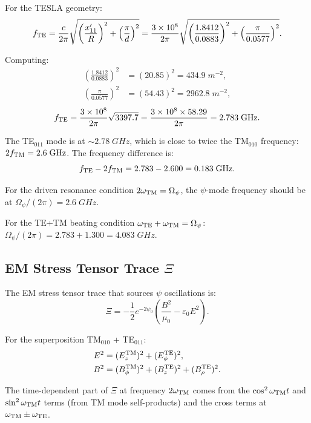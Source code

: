 \documentclass[aps,prd,twocolumn,superscriptaddress,nofootinbib]{revtex4-2}
\newcommand{\ee}[1]{\times 10^{#1}}
\begin{document}
For the TESLA geometry:
\begin{equation}
f_{\rm TE} = \frac{c}{2\pi}\sqrt{\left(\frac{x_{11}'}{R}\right)^2 + \left(\frac{\pi}{d}\right)^2}
= \frac{3\ee{8}}{2\pi}\sqrt{\left(\frac{1.8412}{0.0883}\right)^2 + \left(\frac{\pi}{0.0577}\right)^2}.
\end{equation}

Computing:
\begin{align}
\left(\frac{1.8412}{0.0883}\right)^2 &= (20.85)^2 = 434.9\;\si{m^{-2}}, \\
\left(\frac{\pi}{0.0577}\right)^2 &= (54.43)^2 = 2962.8\;\si{m^{-2}},
\end{align}
\begin{equation}
f_{\rm TE} = \frac{3\ee{8}}{2\pi}\sqrt{3397.7} = \frac{3\ee{8}\times 58.29}{2\pi} = 2.783\;\si{GHz}.
\end{equation}

The TE$_{011}$ mode is at $\sim 2.78\;\si{GHz}$, which is close
to twice the TM$_{010}$ frequency: $2f_{\rm TM} = 2.6\;\si{GHz}$.
The frequency difference is:
\begin{equation}
f_{\rm TE} - 2f_{\rm TM} = 2.783 - 2.600 = 0.183\;\si{GHz}.
\end{equation}

For the driven resonance condition $2\omega_{\rm TM} = \Omega_\psi$,
the $\psi$-mode frequency should be at $\Omega_\psi/(2\pi) = 2.6\;\si{GHz}$.

For the TE+TM beating condition
$\omega_{\rm TE} + \omega_{\rm TM} = \Omega_\psi$:
$\Omega_\psi/(2\pi) = 2.783 + 1.300 = 4.083\;\si{GHz}$.

\subsection{EM Stress Tensor Trace $\Xi$}

The EM stress tensor trace that sources $\psi$ oscillations is:
\begin{equation}
\Xi = -\frac{1}{2}e^{-2\psi_0}\left(\frac{B^2}{\mu_0} - \varepsilon_0 E^2\right).
\label{eq:Xi}
\end{equation}

For the superposition TM$_{010}$ + TE$_{011}$:
\begin{align}
E^2 &= (E_z^{\rm TM})^2 + (E_\phi^{\rm TE})^2, \\
B^2 &= (B_\phi^{\rm TM})^2 + (B_z^{\rm TE})^2 + (B_\rho^{\rm TE})^2.
\end{align}

The time-dependent part of $\Xi$ at frequency $2\omega_{\rm TM}$
comes from the $\cos^2\omega_{\rm TM}t$ and $\sin^2\omega_{\rm TM}t$
terms (from TM mode self-products) and the cross terms at
$\omega_{\rm TM} \pm \omega_{\rm TE}$.
\end{document}
